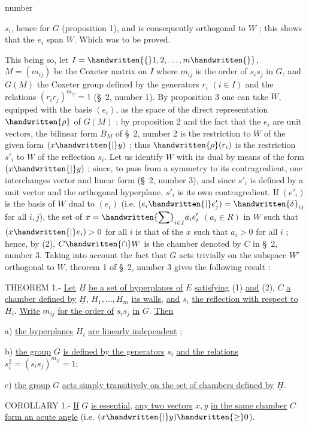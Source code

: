 \begin{flushright}number \end{flushright}
$s_i$, hence for $G$ (proposition 1), and is consequently orthogonal to $W$ ; this shows that the $e_i$ span $W$. Which was to be proved.

This being so, let $I=\handwritten{\{}1,2,\ldots,m\handwritten{\}}$, $M=(m_{ij})$ be the Coxeter matrix on $I$ where $m_{ij}$ is the order of $s_i s_j$ in $G$, and $G(M)$ the Coxeter group defined by the generators $r_i$ $(i\in I)$ and the relations $(r_i r_j)^{m_{ij}}=1$ (\S\ 2, number 1). By proposition 3 one can take $W$, equipped with the basis $(e_i)$, as the space of the direct representation $\handwritten{\rho}$ of $G(M)$ ; by proposition 2 and the fact that the $e_i$ are unit vectors, the bilinear form $B_M$ of \S\ 2, number 2 is the restriction to $W$ of the given form $(x\handwritten{|}y)$ ; thus $\handwritten{\rho}(r_i)$ is the restriction $s'_i$ to $W$ of the reflection $s_i$. Let us identify $W$ with its dual by means of the form $(x\handwritten{|}y)$ ; since, to pass from a symmetry to its contragredient, one interchanges vector and linear form (\S\ 2, number 3), and since $s'_i$ is defined by a unit vector and the orthogonal hyperplane, $s'_i$ is its own contragredient. If $(e'_i)$ is the basis of $W$ dual to $(e_i)$ (i.e. $(e_i\handwritten{|}e'_j)=\handwritten{\delta}_{ij}$ for all $i,j$), the set of $\displaystyle x=\handwritten{\sum}_{i\in I}a_i e'_i$ $(a_i\in R)$ in $W$ such that $(x\handwritten{|}e_i)>0$ for all $i$ is that of the $x$ such that $a_i>0$ for all $i$ ; hence, by (2), $C\handwritten{\cap}W$ is the chamber denoted by $C$ in \S\ 2, number 3. Taking into account the fact that $G$ acts trivially on the subspace $W'$ orthogonal to $W$, theorem 1 of \S\ 2, number 3 gives the following result :

THEOREM 1.- \uline{Let} $\underline{H}$ \uline{be a set of hyperplanes of} $E$ \uline{satisfying} (1) \uline{and} (2), $C$ \uline{a chamber defined by} $\underline{H}$, $H_1,\ldots,H_m$ \uline{its walls}, \uline{and} $s_i$ \uline{the reflection with respect to} $H_i$. \uline{Write} $m_{ij}$ \uline{for the order of} $s_i s_j$ \uline{in} $G$. \uline{Then}

a) \uline{the hyperplanes} $H_i$ \uline{are linearly independent} ;

b) \uline{the group} $G$ \uline{is defined by the generators} $s_i$ \uline{and the relations} $s_i^2=(s_i s_j)^{m_{ij}}=1$;

c) \uline{the group} $G$ \uline{acts simply transitively on the set of chambers defined by} $\underline{H}$.

COROLLARY 1.- \uline{If} $G$ \uline{is essential}, \uline{any two vectors} $x,y$ \uline{in the same chamber} $C$ \uline{form an acute angle} (i.e. $(x\handwritten{|}y)\handwritten{\geq}0$).

